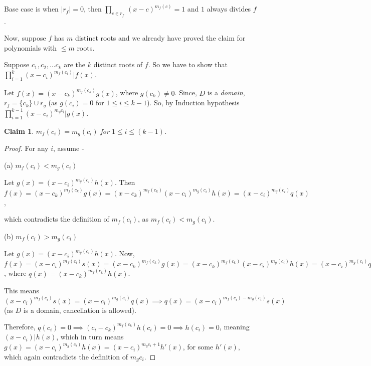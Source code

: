 \documentclass[12pt,a4paper]{article}
\newtheorem{claim}[theorem]{Claim}
\theoremstyle{definition}
\begin{document}
\begin{flushleft}
Base case is when $|r_f| = 0$, then $\prod_{c\in r_f} \, (x - c )^{m_f(c)} = 1$ and $1$ always divides $f$.

Now, suppose $f$ has $m$ distinct roots and we already have proved the claim for polynomials with $\le m$ roots.

\medskip

Suppose $c_1, c_2, \dots c_k$ are the $k$ distinct roots of $f$. So we have to show that $\prod_{i=1}^{k} (x-c_i)^{m_f(c_i)} | f(x)$.

\medskip

Let $f(x) = (x-c_k)^{m_f(c_k)} g(x)$, where $g(c_k) \ne 0$. Since, $D$ is a {\it domain}, $r_f = \{c_k\}\cup r_g$ (as $g(c_i) = 0$ for $1 \le i \le k-1$). So, by Induction hypothesis $\prod_{i = 1}^{k-1} (x-c_i)^{m_g{c_i}} | g(x)$.

\begin{claim}
	$m_f(c_i) = m_g(c_i) $ for $1\le i \le (k-1)$.
\end{claim}

\begin{proof}
	For any $i$, assume -

	\medskip

	(a) $m_f(c_i) < m_g(c_i)$

	\medskip

	Let $g(x) = (x-c_i)^{m_g(c_i)}h(x)$. Then $f(x) = (x-c_k)^{m_f(c_k)}g(x) = (x-c_k)^{m_f(c_k)}(x-c_i)^{m_g(c_i)}h(x) = (x-c_i)^{m_g(c_i)}q(x)$, 

	which contradicts the definition of $m_f(c_i)$, as $m_f(c_i) < m_g(c_i)$.

	\medskip

	(b) $m_f(c_i) > m_g(c_i)$

	\medskip

	Let $g(x) = (x-c_i)^{m_g(c_i)}h(x) $. Now, $f(x) = (x-c_i)^{m_f(c_i)}s(x) = (x-c_k)^{m_f(c_k)}g(x) =  (x-c_k)^{m_f(c_k)}(x-c_i)^{m_g(c_i)}h(x) = (x-c_i)^{m_g(c_i)}q(x)$, where $q(x) = (x-c_k)^{m_f(c_k)}h(x)$.

	This means $(x-c_i)^{m_f(c_i)}s(x) = (x-c_i)^{m_g(c_i)}q(x) \implies q(x) = (x-c_i)^{m_f(c_i)-m_g(c_i)}s(x)$ (as $D$ is a domain, cancellation is allowed).

	Therefore, $q(c_i) = 0 \implies (c_i-c_k)^{m_f(c_k)}h(c_i) = 0 \implies h(c_i) = 0$, meaning $(x-c_i)|h(x)$, which in turn means $g(x) = (x-c_i)^{m_g(c_i)}h(x) = (x-c_i)^{m_g{c_i} + 1}h'(x) $, for some $h'(x)$, which again contradicts the definition of $m_g{c_i}$.

	\medskip


\end{proof}
\end{flushleft}
\end{document}
